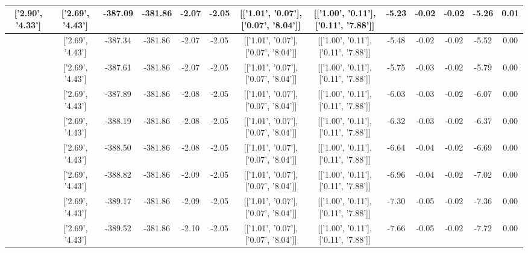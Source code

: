 \begin{table}[htbp]
\begin{adjustbox}{angle=90}
\begin{tabular}{|c|c|c|c|c|c|c|c|c|c|c|c|c|}
 ['2.90', '4.33'] & ['2.69', '4.43'] & -387.09 & -381.86 & -2.07 & -2.05 & [['1.01', '0.07'], ['0.07', '8.04']] & [['1.00', '0.11'], ['0.11', '7.88']] & -5.23 & -0.02 & -0.02 & -5.26 & 0.01\\ \hline
 ['2.91', '4.32'] & ['2.69', '4.43'] & -387.34 & -381.86 & -2.07 & -2.05 & [['1.01', '0.07'], ['0.07', '8.04']] & [['1.00', '0.11'], ['0.11', '7.88']] & -5.48 & -0.02 & -0.02 & -5.52 & 0.00\\ \hline
 ['2.92', '4.32'] & ['2.69', '4.43'] & -387.61 & -381.86 & -2.07 & -2.05 & [['1.01', '0.07'], ['0.07', '8.04']] & [['1.00', '0.11'], ['0.11', '7.88']] & -5.75 & -0.03 & -0.02 & -5.79 & 0.00\\ \hline
 ['2.94', '4.31'] & ['2.69', '4.43'] & -387.89 & -381.86 & -2.08 & -2.05 & [['1.01', '0.07'], ['0.07', '8.04']] & [['1.00', '0.11'], ['0.11', '7.88']] & -6.03 & -0.03 & -0.02 & -6.07 & 0.00\\ \hline
 ['2.95', '4.31'] & ['2.69', '4.43'] & -388.19 & -381.86 & -2.08 & -2.05 & [['1.01', '0.07'], ['0.07', '8.04']] & [['1.00', '0.11'], ['0.11', '7.88']] & -6.32 & -0.03 & -0.02 & -6.37 & 0.00\\ \hline
 ['2.96', '4.30'] & ['2.69', '4.43'] & -388.50 & -381.86 & -2.08 & -2.05 & [['1.01', '0.07'], ['0.07', '8.04']] & [['1.00', '0.11'], ['0.11', '7.88']] & -6.64 & -0.04 & -0.02 & -6.69 & 0.00\\ \hline
 ['2.97', '4.29'] & ['2.69', '4.43'] & -388.82 & -381.86 & -2.09 & -2.05 & [['1.01', '0.07'], ['0.07', '8.04']] & [['1.00', '0.11'], ['0.11', '7.88']] & -6.96 & -0.04 & -0.02 & -7.02 & 0.00\\ \hline
 ['2.99', '4.29'] & ['2.69', '4.43'] & -389.17 & -381.86 & -2.09 & -2.05 & [['1.01', '0.07'], ['0.07', '8.04']] & [['1.00', '0.11'], ['0.11', '7.88']] & -7.30 & -0.05 & -0.02 & -7.36 & 0.00\\ \hline
 ['3.00', '4.28'] & ['2.69', '4.43'] & -389.52 & -381.86 & -2.10 & -2.05 & [['1.01', '0.07'], ['0.07', '8.04']] & [['1.00', '0.11'], ['0.11', '7.88']] & -7.66 & -0.05 & -0.02 & -7.72 & 0.00\\ \hline
            \end{tabular}
        \end{adjustbox}
        \caption{}
        \label{}
    \end{table}
    